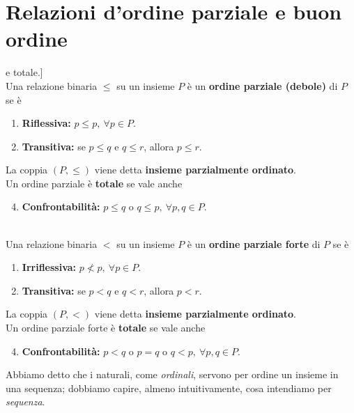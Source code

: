\section{Relazioni d'ordine parziale e buon ordine}
\begin{define}[Relazione d'ordine parziale [(debole)] e totale.]~{}\\
	Una relazione binaria $\leq$ su un insieme $P$ è un \textbf{ordine parziale (debole)} di $P$ se è
	\begin{enumerate}
		\item \textbf{Riflessiva:} $p\leq p,\ \forall p\in P$.
		\item \textbf{Transitiva:} se $p\leq q$ e $q\leq r$, allora $p\leq r$.
	\end{enumerate}
	La coppia $\left(P,\leq\right)$ viene detta \textbf{insieme parzialmente ordinato}.\\
	Un ordine parziale è \textbf{totale} se vale anche
	\begin{enumerate}
		\setcounter{enumi}{3}
		\item \textbf{Confrontabilità:} $p\leq q$ o $q\leq p,\ \forall p,q\in P$.
	\end{enumerate}
\end{define}
\begin{define}~{}\\
	Una relazione binaria $<$ su un insieme $P$ è un \textbf{ordine parziale forte} di $P$ se è
	\begin{enumerate}
		\item \textbf{Irriflessiva:} $p\nless p,\ \forall p\in P$.
		\item \textbf{Transitiva:} se $p<q$ e $q<r$, allora $p<r$.
	\end{enumerate}
	La coppia $\left(P,<\right)$ viene detta \textbf{insieme parzialmente ordinato}.\\
	Un ordine parziale forte è \textbf{totale} se vale anche
	\begin{enumerate}
		\setcounter{enumi}{3}
		\item \textbf{Confrontabilità:} $p<q$ o $p=q$ o $q<p,\ \forall p,q\in P$.
	\end{enumerate}
\end{define}
Abbiamo detto che i naturali, come \textit{ordinali}, servono per ordine un insieme in una sequenza; dobbiamo capire, almeno intuitivamente, cosa intendiamo per \textit{sequenza}.\\
